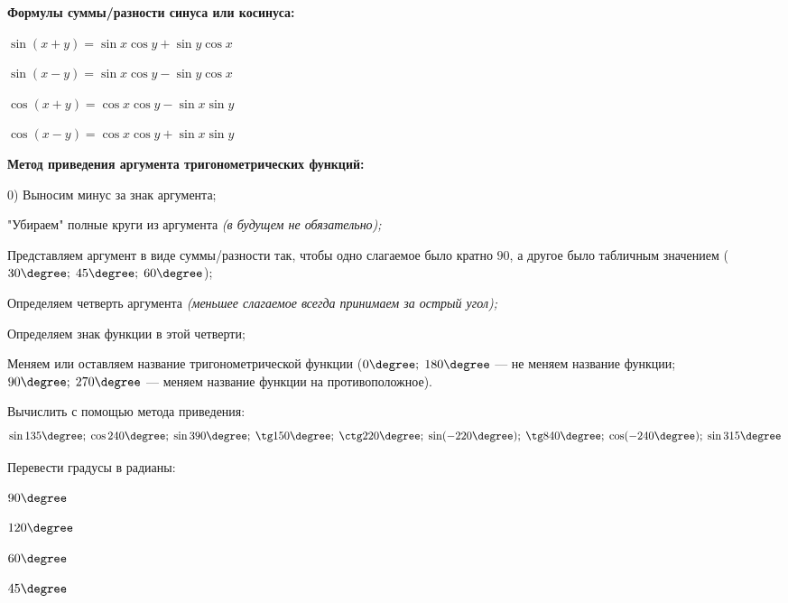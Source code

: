 %
%
%
%
\begin{class}[number=5]
	\begin{listofex}
		\item \textbf{Формулы суммы/разности синуса или косинуса:}
		\begin{enumcols}[itemcolumns=2]
			\item \( \sin(x+y)=\sin x\cos y + \sin y \cos x \)
			\item \( \sin(x-y)=\sin x\cos y - \sin y \cos x \)
			\item \( \cos(x+y)=\cos x \cos y - \sin x \sin y \)
			\item \( \cos(x-y)=\cos x \cos y + \sin x \sin y \)
		\end{enumcols}
		\item \textbf{Метод приведения аргумента тригонометрических функций:}
		\begin{enumcols}
			\item[0)] Выносим минус за знак аргумента;
			\item "Убираем"{ }полные круги из аргумента \textit{(в будущем не обязательно);}
			\item Представляем аргумент в виде суммы/разности так, чтобы одно слагаемое было кратно \( 90 \), а другое было табличным значением (\( 30\degree;\;45\degree;\;60\degree \));
			\item Определяем четверть аргумента \textit{(меньшее слагаемое всегда принимаем за острый угол);}
			\item Определяем знак функции в этой четверти;
			\item Меняем или оставляем название тригонометрической функции (\( 0\degree;\;180\degree \) --- не меняем название функции; \( 90\degree;\;270\degree \) --- меняем название функции на противоположное).
		\end{enumcols}
		\item Вычислить с помощью метода приведения:
		\[ \sin135\degree;\;\cos240\degree;\;\sin390\degree;\;\tg150\degree;\;\ctg220\degree;\;\sin(-220\degree);\;\tg840\degree;\;\cos(-240\degree);\;\sin315\degree \]
		\item Перевести градусы в радианы:
		\begin{enumcols}[itemcolumns=5]
			\item \( 90\degree \)
			\item \( 120\degree \)
			\item \( 60\degree \)
			\item \( 45\degree \)

\end{enumcols}
\end{listofex}
\end{class}
